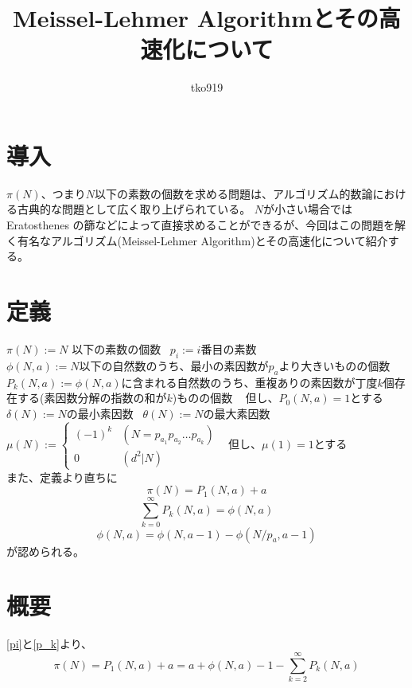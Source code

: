 \documentclass[a4paper]{jsarticle}
\begin{document}
\title{Meissel-Lehmer Algorithmとその高速化について}
\author{tko919}

\maketitle

\section{導入}
$\pi(N)$、つまり$N$以下の素数の個数を求める問題は、アルゴリズム的数論における古典的な問題として広く取り上げられている。
$N$が小さい場合では Eratosthenes の篩などによって直接求めることができるが、今回はこの問題を解く有名なアルゴリズム(Meissel-Lehmer Algorithm)とその高速化について紹介する。

\section{定義} \noindent
$\pi(N):=N$ 以下の素数の個数 \ $p_i:=i$番目の素数 \\
$\phi(N,a):=N$以下の自然数のうち、最小の素因数が$p_a$より大きいものの個数 \\
$P_k(N,a) := \phi(N,a)$に含まれる自然数のうち、重複ありの素因数が丁度$k$個存在する(素因数分解の指数の和が$k$)ものの個数 ~ 但し、$P_0(N,a)=1$とする \\
$\delta(N) := N$の最小素因数 \ $\theta(N) := N$の最大素因数 \\
$\mu(N) := \begin{cases}
    (-1)^k & (N=p_{a_1} p_{a_2} \ldots p_{a_k}) \\
    0 & (d^2|N)
\end{cases}$ \ 但し、$\mu(1)=1$とする \\

また、定義より直ちに
\begin{equation}
    \pi(N)=P_1(N,a)+a
    \label{pi}
\end{equation}
\begin{equation}
    \displaystyle
    \sum_{k=0}^\infty P_k(N,a)=\phi(N,a)
    \label{p_k}
\end{equation}
\begin{equation}
    \phi(N,a)=\phi(N,a-1)-\phi(N/p_a,a-1)
    \label{phi_rec}
\end{equation}
が認められる。

\section{概要}
\eqref{pi}と\eqref{p_k}より、
\begin{equation}
    \displaystyle
    \pi(N)=P_1(N,a)+a=a+\phi(N,a)-1-\sum_{k=2}^\infty P_k(N,a)
\end{equation}
\end{document}
